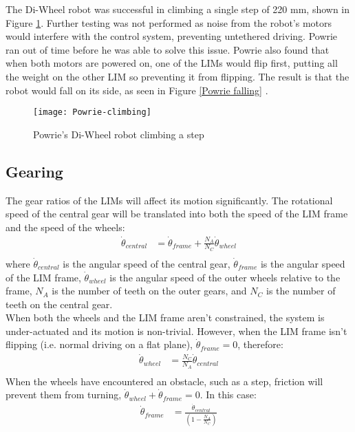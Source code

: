 The Di-Wheel robot was successful in climbing a single step of 220 mm, shown in Figure \ref{Powrie climbing}. Further testing was not performed as noise from the robot's motors would interfere with the control system, preventing untethered driving. Powrie ran out of time before he was able to solve this issue. Powrie also found that when both motors are powered on, one of the LIMs would flip first, putting all the weight on the other LIM so preventing it from flipping. The result is that the robot would fall on its side, as seen in Figure \ref{Powrie falling} \citep{Powrie-2019}.\\


\newpage

\begin{figure}[h]
	\centering
	\texttt{[image: Powrie-climbing]}
	\caption{Powrie's Di-Wheel robot climbing a step \citep{Powrie-2019}}
	\label{Powrie climbing}
\end{figure}

\newpage

\subsection{Gearing} %
The gear ratios of the LIMs will affect its motion significantly. The rotational speed of the central gear will be translated into both the speed of the LIM frame and the speed of the wheels:
\begin{align*}
	\dot{\theta}_{central} &= \dot{\theta}_{frame} + \frac{N_A}{N_C}\dot{\theta}_{wheel} \tag{1}\\
\end{align*}
where $\dot{\theta}_{central}$ is the angular speed of the central gear, $\dot{\theta}_{frame}$ is the angular speed of the LIM frame, $\dot{\theta}_{wheel}$ is the angular speed of the outer wheels relative to the frame, $N_A$ is the number of teeth on the outer gears, and $N_C$ is the number of teeth on the central gear.\\

When both the wheels and the LIM frame aren't constrained, the system is under-actuated and its motion is non-trivial. However, when the LIM frame isn't flipping (i.e. normal driving on a flat plane), $\dot{\theta}_{frame} = 0$, therefore:\\
 \begin{align*}
 	\dot{\theta}_{wheel} &= \frac{N_C}{N_A}\dot{\theta}_{central} \tag{2}\\
 \end{align*}
When the wheels have encountered an obstacle, such as a step, friction will prevent them from turning, $\dot{\theta}_{wheel} + \dot{\theta}_{frame} = 0$. In this case:
\begin{align*}
	\dot{\theta}_{frame} &= \frac{\dot{\theta}_{central}}{(1-\frac{N_A}{N_C})} \tag{3}\\
\end{align*}

